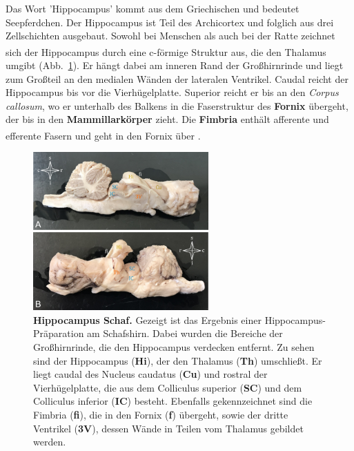 \documentclass[12pt,a4paper,pdftex]{article}
\begin{document}
Das Wort 'Hippocampus' kommt aus dem Griechischen und bedeutet Seepferdchen. Der Hippocampus ist Teil des Archicortex und folglich aus drei Zellschichten ausgebaut. Sowohl bei Menschen als auch bei der Ratte zeichnet sich der Hippocampus durch eine c-förmige Struktur aus, \textsuperscript{\cite[20]{paxinos2014rat}} die den Thalamus umgibt (Abb.~\ref{fig:hippocampus_schaf}). Er hängt dabei am inneren Rand der Großhirnrinde und liegt zum Großteil an den medialen Wänden der lateralen Ventrikel. Caudal reicht der Hippocampus bis vor die Vierhügelplatte. Superior reicht er bis an den \textit{Corpus callosum}, wo er unterhalb des Balkens in die Faserstruktur des \textbf{Fornix} übergeht, der bis in den \textbf{Mammillarkörper} zieht. Die \textbf{Fimbria} enthält afferente und efferente Fasern und geht in den Fornix über \textsuperscript{\cite[9]{trepel2011neuroanatomie}}.\\

\begin{figure}[H]
    \centering
    \includegraphics[width=0.6\textwidth]{pictures/Bilder_Jule/Schaf/Ausschnitte/hippocampus_schaf.png}
    \caption[Hippocampus Schaf]{\textbf{Hippocampus Schaf.} Gezeigt ist das Ergebnis einer Hippocampus-Präparation am Schafshirn. Dabei wurden die Bereiche der Großhirnrinde, die den Hippocampus verdecken entfernt. Zu sehen sind der Hippocampus (\textbf{Hi}), der den Thalamus (\textbf{Th}) umschließt. Er liegt caudal des Nucleus caudatus (\textbf{Cu}) und rostral der Vierhügelplatte, die aus dem Colliculus superior (\textbf{SC}) und dem Colliculus inferior (\textbf{IC}) besteht. Ebenfalls gekennzeichnet sind die Fimbria (\textbf{fi}), die in den Fornix (\textbf{f}) übergeht, sowie der dritte Ventrikel (\textbf{3V}), dessen Wände in Teilen vom Thalamus gebildet werden.}
    \label{fig:hippocampus_schaf}
\end{figure}{}
\end{document}
